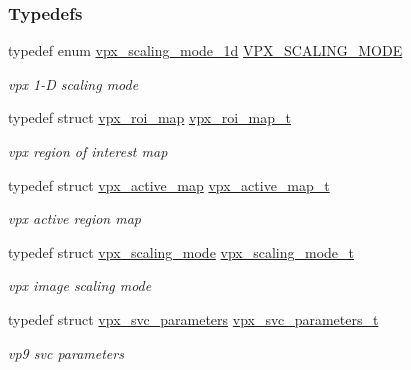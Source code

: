 \subsubsection*{\-Typedefs}
\begin{DoxyCompactItemize}
\item 
typedef enum \hyperlink{group__vp8__encoder_ga70071b1bb6cac9a1ef0ea3d8362ff94f}{vpx\-\_\-scaling\-\_\-mode\-\_\-1d} \hyperlink{group__vp8__encoder_ga100ca891ad96995e61780ae777bf8663}{\-V\-P\-X\-\_\-\-S\-C\-A\-L\-I\-N\-G\-\_\-\-M\-O\-D\-E}
\begin{DoxyCompactList}\small\item\em vpx 1-\/\-D scaling mode \end{DoxyCompactList}\item 
typedef struct \hyperlink{structvpx__roi__map}{vpx\-\_\-roi\-\_\-map} \hyperlink{group__vp8__encoder_ga5be1a94d436a5e9296f5be06f57ccbd1}{vpx\-\_\-roi\-\_\-map\-\_\-t}
\begin{DoxyCompactList}\small\item\em vpx region of interest map \end{DoxyCompactList}\item 
typedef struct \hyperlink{structvpx__active__map}{vpx\-\_\-active\-\_\-map} \hyperlink{group__vp8__encoder_ga7b48f7962f5061979f0f8ece6fb1cba8}{vpx\-\_\-active\-\_\-map\-\_\-t}
\begin{DoxyCompactList}\small\item\em vpx active region map \end{DoxyCompactList}\item 
typedef struct \hyperlink{structvpx__scaling__mode}{vpx\-\_\-scaling\-\_\-mode} \hyperlink{group__vp8__encoder_ga9600359ed9096cd96c621d9cf6c8df38}{vpx\-\_\-scaling\-\_\-mode\-\_\-t}
\begin{DoxyCompactList}\small\item\em vpx image scaling mode \end{DoxyCompactList}\item 
typedef struct \hyperlink{structvpx__svc__parameters}{vpx\-\_\-svc\-\_\-parameters} \hyperlink{group__vp8__encoder_gaf01e78e24ae1cb54e8a455d74f3c31c8}{vpx\-\_\-svc\-\_\-parameters\-\_\-t}
\begin{DoxyCompactList}\small\item\em vp9 svc parameters \end{DoxyCompactList}\end{DoxyCompactItemize}
